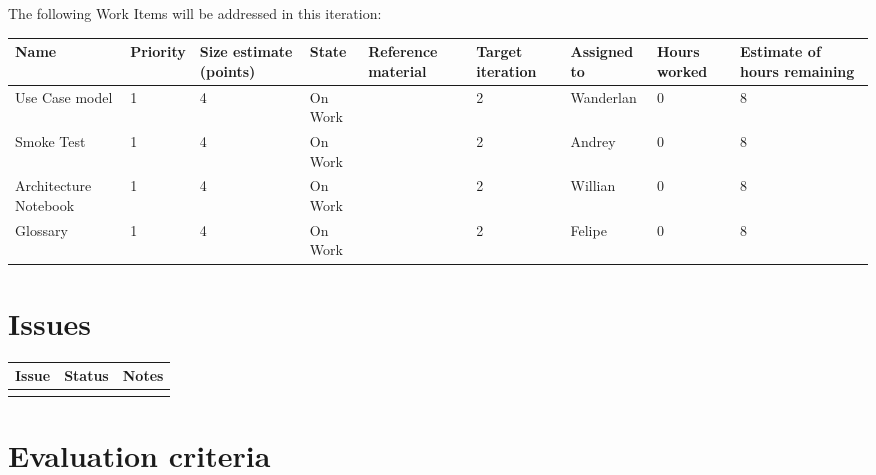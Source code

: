 \documentclass[a4paper,notitlepage]{article}%
\begin{document}
The following Work Items will be addressed in this iteration:

\begin{adjustbox}{width=\textwidth}
\noindent\begin{tabular}{|l|l|l|l|l|l|l|l|l|}
\hline
Name & Priority & Size estimate (points) & State & Reference material & Target iteration & Assigned to & Hours worked & Estimate of hours remaining \\ \hline
Use Case model & 1 & 4 & On Work & & 2 & Wanderlan & 0 & 8 \\ \hline
Smoke Test & 1 & 4 & On Work & & 2 & Andrey & 0 & 8 \\ \hline
Architecture Notebook & 1 & 4 & On Work & & 2 & Willian & 0 & 8 \\ \hline
Glossary & 1 & 4 & On Work & & 2 & Felipe & 0 & 8 \\ \hline
\end{tabular}
\end{adjustbox}

\section{Issues}



\noindent\begin{tabular}{|l|l|l|}
\hline
Issue & Status & Notes \\
\hline
 &  & \\
\hline
\end{tabular}

\section{Evaluation criteria}


\end{document}
